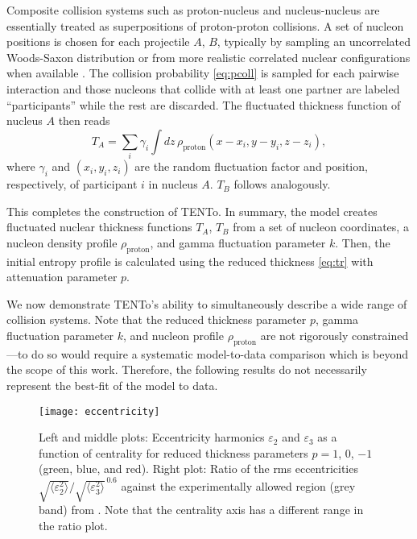 \documentclass[aps,prc,reprint,amsmath,nofootinbib]{revtex4-1}
\newcommand{\trento}{T\raisebox{-.5ex}{R}ENTo}
\newcommand{\eccratio}{\sqrt{\langle \varepsilon_2^2 \rangle}/\sqrt{\langle \varepsilon_3^2 \rangle}^{\,0.6}}
\begin{document}

Composite collision systems such as proton-nucleus and nucleus-nucleus are essentially treated as
superpositions of proton-proton collisions.
A set of nucleon positions is chosen for each projectile $A$, $B$, typically by sampling an uncorrelated Woods-Saxon distribution or from more realistic correlated nuclear configurations when available \cite{Alvioli:2009ab}.
The collision probability \eqref{eq:pcoll} is sampled for each pairwise interaction and those nucleons that collide with at least one partner are labeled ``participants'' while the rest are discarded.
The fluctuated thickness function of nucleus $A$ then reads
\begin{equation}
  T_A = \sum_i \gamma_i \int dz \, \rho_\text{proton}(x - x_i, y - y_i, z - z_i),
  \label{nuclear thickness}
\end{equation}
where $\gamma_i$ and $(x_i, y_i, z_i)$ are the random fluctuation factor and position, respectively, of participant $i$ in nucleus $A$.
$T_B$ follows analogously.

This completes the construction of \trento.
In summary, the model creates fluctuated nuclear thickness functions $T_A$, $T_B$ from a set of nucleon coordinates, a nucleon density profile $\rho_\text{proton}$, and gamma fluctuation parameter $k$.
Then, the initial entropy profile is calculated using the reduced thickness \eqref{eq:tr} with attenuation parameter $p$.


We now demonstrate \trento's ability to simultaneously describe a wide range of collision systems.
Note that the reduced thickness parameter $p$, gamma fluctuation parameter $k$, and nucleon profile $\rho_\text{proton}$ are not rigorously constrained---to do so would require a systematic model-to-data comparison which is beyond the scope of this work.
Therefore, the following results do not necessarily represent the best-fit of the model to data.

\begin{figure*}[t]
  \texttt{[image: eccentricity]}
  \caption{
    \label{fig:eccen}
    Left and middle plots:  Eccentricity harmonics $\varepsilon_2$ and $\varepsilon_3$ as a function of centrality
    for reduced thickness parameters $p = 1$, 0, $-1$ (green, blue, and red).  Right plot:  Ratio of the rms eccentricities
    $\eccratio$ against the experimentally allowed region (grey band) from \cite{Retinskaya:2013gca}.  Note that the centrality
    axis has a different range in the ratio plot.
  }
\end{figure*}
\end{document}
